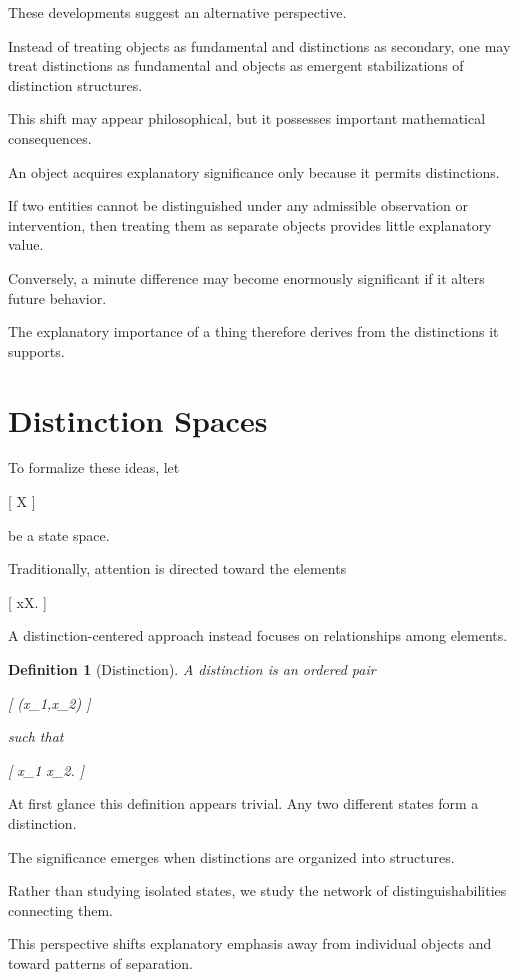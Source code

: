 \documentclass[11pt,oneside,openany]{book}
\newtheorem{definition}{Definition}[chapter] \newtheorem{theorem}{Theorem}[chapter] \newtheorem{proposition}{Proposition}[chapter] \newtheorem{lemma}{Lemma}[chapter] \newtheorem{corollary}{Corollary}[chapter] \newtheorem{remark}{Remark}[chapter]
\begin{document}
These developments suggest an alternative perspective.

Instead of treating objects as fundamental and distinctions as secondary, one may treat distinctions as fundamental and objects as emergent stabilizations of distinction structures.

This shift may appear philosophical, but it possesses important mathematical consequences.

An object acquires explanatory significance only because it permits distinctions.

If two entities cannot be distinguished under any admissible observation or intervention, then treating them as separate objects provides little explanatory value.

Conversely, a minute difference may become enormously significant if it alters future behavior.

The explanatory importance of a thing therefore derives from the distinctions it supports.

\section{Distinction Spaces}

To formalize these ideas, let

[
\mathcal X
]

be a state space.

Traditionally, attention is directed toward the elements

[
x\in\mathcal X.
]

A distinction-centered approach instead focuses on relationships among elements.

\begin{definition}[Distinction]

A distinction is an ordered pair

[
(x_1,x_2)
]

such that

[
x_1 \neq x_2.
]

\end{definition}

At first glance this definition appears trivial. Any two different states form a distinction.

The significance emerges when distinctions are organized into structures.

Rather than studying isolated states, we study the network of distinguishabilities connecting them.

This perspective shifts explanatory emphasis away from individual objects and toward patterns of separation.
\end{document}
